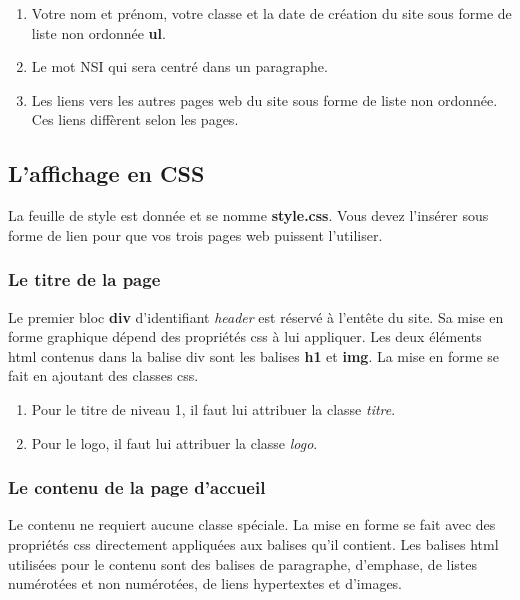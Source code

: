 \begin{enumerate}
\tightlist
\item
  Votre nom et prénom, votre classe et la date de création du site sous
  forme de liste non ordonnée \textbf{ul}.
\item
  Le mot NSI qui sera centré dans un paragraphe.
\item
  Les liens vers les autres pages web du site sous forme de liste non
  ordonnée. Ces liens diffèrent selon les pages.
\end{enumerate}

\hypertarget{laffichage-en-css}{%
\subsection{L'affichage en CSS}\label{laffichage-en-css}}

La feuille de style est donnée et se nomme \textbf{style.css}. Vous
devez l'insérer sous forme de lien pour que vos trois pages web puissent
l'utiliser.

\hypertarget{le-titre-de-la-page}{%
\subsubsection{Le titre de la page}\label{le-titre-de-la-page}}

Le premier bloc \textbf{div} d'identifiant \emph{header} est réservé à
l'entête du site. Sa mise en forme graphique dépend des propriétés css à
lui appliquer. Les deux éléments html contenus dans la balise div sont
les balises \textbf{h1} et \textbf{img}. La mise en forme se fait en
ajoutant des classes css.

\begin{enumerate}
\tightlist
\item
  Pour le titre de niveau 1, il faut lui attribuer la classe
  \emph{titre}.
\item
  Pour le logo, il faut lui attribuer la classe \emph{logo}.
\end{enumerate}

\hypertarget{le-contenu-de-la-page-daccueil}{%
\subsubsection{Le contenu de la page
d'accueil}\label{le-contenu-de-la-page-daccueil}}

Le contenu ne requiert aucune classe spéciale. La mise en forme se fait
avec des propriétés css directement appliquées aux balises qu'il
contient. Les balises html utilisées pour le contenu sont des balises de
paragraphe, d'emphase, de listes numérotées et non numérotées, de liens
hypertextes et d'images.

